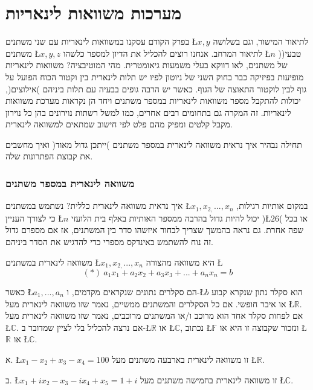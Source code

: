 

\chapter{\beginR מערכות משוואות לינאריות\endR}

בפרק הקודם עסקנו במשוואות לינאריות עם שני משתנים \L{$x,y$} לתיאור
המישור, וגם בשלושה משתנים \L{$x,y,z$} לתיאור המרחב. אנחנו רוצים להכליל
את הדיון למספר כלשהו \L{$n$} )טבעי( של משתנים, לאו דווקא בעלי משמעות
גיאומטרית. מהי המוטיבציה? משוואות לינאריות מופיעות בפיזיקה כבר בחוק
השני של ניוטון לפיו יש תלות לינארית בין וקטור הכוח הפועל על גוף לבין
לוקטור התאוצה של הגוף. כאשר יש הרבה גופים בבעיה עם תלות ביניהם )אילוצים(,
יכולות להתקבל מספר משוואות לינאריות במספר משתנים ויחד הן נקראות מערכת
משוואות לינאריות. זה המקרה גם בתחומים רבים אחרים, כמו למשל רשתות נוירונים
בהן כל נוירון מקבל קלטים ומפיק מהם פלט לפי חישוב שמתאים למשוואה לינארית. 

תחילה נבהיר איך נראית משוואה לינארית במספר משתנים )ייתכן גדול מאוד(
ואיך מחשבים את קבוצת הפתרונות שלה.

\subsection{משוואה לינארית במספר משתנים}

איך נראית משוואה לינארית כללית? נשתמש במשתנים \L{$x_{1},x_{2,}...,x_{n}$}
במקום אותיות רגילות, כי לצורך העניין \L{$n$} יכול להיות גדול בהרבה
ממספר האותיות באלף בית הלועזי )\L{$26$}( או בכל שפה אחרת. גם נראה
בהמשך שצריך לבחור איזשהו סדר בין המשתנים, אז אם מספרם גדול זה נוח
להשתמש באינדקס מספרי כדי להדגיש את הסדר ביניהם.

\begin{hdef}
משוואה לינארית במשתנים \L{$x_{1},x_{2,}...,x_{n}$} היא משוואה
מהצורה \L{%
\[
(*)\:a_{1}x_{1}+a_{2}x_{2}+a_{3}x_{3}+...+a_{n}x_{n}=b
\]
}%

כאשר \L{$a_{1},...,a_{n}$} הם סקלרים נתונים שנקראים מקדמים, ו-\L{$b$}
הוא סקלר נתון שנקרא קבוע או איבר חופשי. אם כל הסקלרים והמשתנים ממשיים,
נאמר שזו משוואה לינארית מעל \L{$\mathbb{\mathbb{R}}$}. אם לפחות סקלר
אחד הוא מרוכב ו/או המשתנים מרוכבים, נאמר שזו משוואה לינארית מעל \L{$\mathbb{C}$}.
אם נרצה להכליל בלי לציין שמדובר ב-\L{$\mathbb{R}$} או \L{$\mathbb{\mathbb{C}}$},
נכתוב \L{$\mathbb{F}$} ונזכור שקבוצה זו היא או \L{$\mathbb{R}$}
או \L{$\mathbb{C}$}.
\end{hdef}

\begin{examples}
א. \L{$x_{1}-x_{2}+x_{3}-x_{4}=100$} זו משוואה לינארית בארבעה
משתנים מעל \L{$\mathbb{R}$}.

ב. \L{$x_{1}+ix_{2}-x_{3}-ix_{4}+x_{5}=1+i$} זו משוואה לינארית בחמישה
משתנים מעל \L{$\mathbb{C}$}.
\end{examples}

